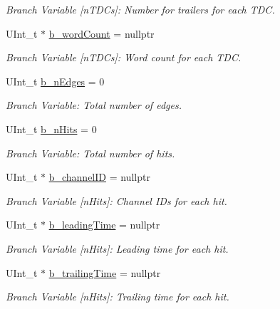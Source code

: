 \begin{DoxyCompactItemize}
\begin{DoxyCompactList}\small\item\em Branch Variable \mbox{[}n\+T\+D\+Cs\mbox{]}\+: Number for trailers for each T\+DC. \end{DoxyCompactList}\item 
U\+Int\+\_\+t $\ast$ \hyperlink{class_event_tree_manager_a7151f5beadcec7080e1b95f12e52a40a}{b\+\_\+word\+Count} = nullptr
\begin{DoxyCompactList}\small\item\em Branch Variable \mbox{[}n\+T\+D\+Cs\mbox{]}\+: Word count for each T\+DC. \end{DoxyCompactList}\item 
U\+Int\+\_\+t \hyperlink{class_event_tree_manager_a050eedbaf401226c641f54b533cf8d01}{b\+\_\+n\+Edges} = 0
\begin{DoxyCompactList}\small\item\em Branch Variable\+: Total number of edges. \end{DoxyCompactList}\item 
U\+Int\+\_\+t \hyperlink{class_event_tree_manager_a7b7301d89e353ca96b42bcfb360c325e}{b\+\_\+n\+Hits} = 0
\begin{DoxyCompactList}\small\item\em Branch Variable\+: Total number of hits. \end{DoxyCompactList}\item 
U\+Int\+\_\+t $\ast$ \hyperlink{class_event_tree_manager_a663158889f41e6c32537aa698292e4ec}{b\+\_\+channel\+ID} = nullptr
\begin{DoxyCompactList}\small\item\em Branch Variable \mbox{[}n\+Hits\mbox{]}\+: Channel I\+Ds for each hit. \end{DoxyCompactList}\item 
U\+Int\+\_\+t $\ast$ \hyperlink{class_event_tree_manager_a4a117b0ff10078a9946096a868f243ce}{b\+\_\+leading\+Time} = nullptr
\begin{DoxyCompactList}\small\item\em Branch Variable \mbox{[}n\+Hits\mbox{]}\+: Leading time for each hit. \end{DoxyCompactList}\item 
U\+Int\+\_\+t $\ast$ \hyperlink{class_event_tree_manager_ad7533269c176ad00ec0fffe2afdf351a}{b\+\_\+trailing\+Time} = nullptr
\begin{DoxyCompactList}\small\item\em Branch Variable \mbox{[}n\+Hits\mbox{]}\+: Trailing time for each hit. \end{DoxyCompactList}\item 

\end{DoxyCompactItemize}
